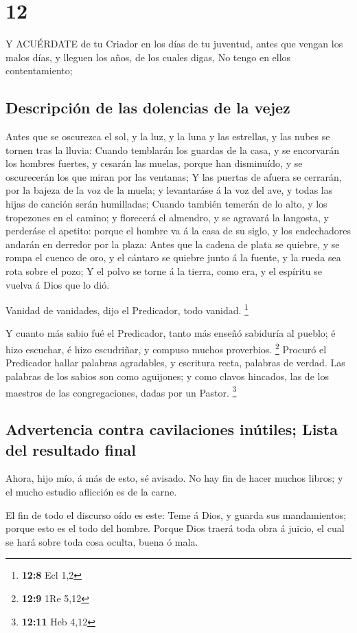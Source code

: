 \hypertarget{section-11}{%
\section{12}\label{section-11}}

 Y ACUÉRDATE de tu Criador en los días de tu juventud, antes
que vengan los malos días, y lleguen los años, de los cuales digas, No
tengo en ellos contentamiento;

\hypertarget{descripciuxf3n-de-las-dolencias-de-la-vejez}{%
\subsection{Descripción de las dolencias de la
vejez}\label{descripciuxf3n-de-las-dolencias-de-la-vejez}}

 Antes que se oscurezca el sol, y la luz, y la luna y las
estrellas, y las nubes se tornen tras la lluvia:  Cuando
temblarán los guardas de la casa, y se encorvarán los hombres fuertes, y
cesarán las muelas, porque han disminuído, y se oscurecerán los que
miran por las ventanas;  Y las puertas de afuera se
cerrarán, por la bajeza de la voz de la muela; y levantaráse á la voz
del ave, y todas las hijas de canción serán humilladas; 
Cuando también temerán de lo alto, y los tropezones en el camino; y
florecerá el almendro, y se agravará la langosta, y perderáse el
apetito: porque el hombre va á la casa de su siglo, y los endechadores
andarán en derredor por la plaza:  Antes que la cadena de
plata se quiebre, y se rompa el cuenco de oro, y el cántaro se quiebre
junto á la fuente, y la rueda sea rota sobre el pozo;  Y el
polvo se torne á la tierra, como era, y el espíritu se vuelva á Dios que
lo dió.

 Vanidad de vanidades, dijo el Predicador, todo vanidad.
\footnote{\textbf{12:8} Ecl 1,2}

 Y cuanto más sabio fué el Predicador, tanto más enseñó
sabiduría al pueblo; é hizo escuchar, é hizo escudriñar, y compuso
muchos proverbios. \footnote{\textbf{12:9} 1Re 5,12} 
Procuró el Predicador hallar palabras agradables, y escritura recta,
palabras de verdad.  Las palabras de los sabios son como
aguijones; y como clavos hincados, las de los maestros de las
congregaciones, dadas por un Pastor. \footnote{\textbf{12:11} Heb 4,12}

\hypertarget{advertencia-contra-cavilaciones-inuxfatiles-lista-del-resultado-final}{%
\subsection{Advertencia contra cavilaciones inútiles; Lista del
resultado
final}\label{advertencia-contra-cavilaciones-inuxfatiles-lista-del-resultado-final}}

 Ahora, hijo mío, á más de esto, sé avisado. No hay fin de
hacer muchos libros; y el mucho estudio aflicción es de la carne.

 El fin de todo el discurso oído es este: Teme á Dios, y
guarda sus mandamientos; porque esto es el todo del hombre.
 Porque Dios traerá toda obra á juicio, el cual se hará
sobre toda cosa oculta, buena ó mala.
